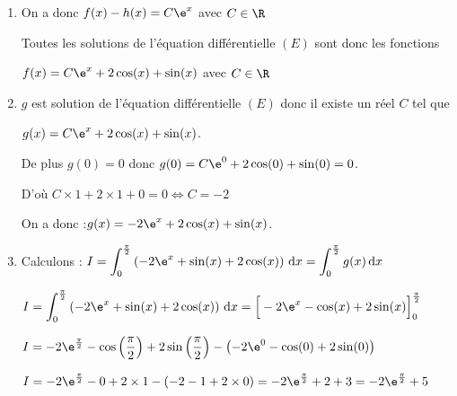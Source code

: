 \begin{enumerate}
\emph{Conclusion :} $f$ est solution de $(E)$ si et seulement si $f-h$ est solution de $(E_0)$.
		\item

On a donc $f(x)-h(x)= C\e^x$ avec $C \in \R$

Toutes les solutions de l'équation différentielle $(E)$ sont donc les fonctions

$f(x)=C\e^x +2\cos(x)+\sin(x)$ avec $C \in \R$

\item $g$ est solution de l'équation différentielle $(E)$  donc il existe un réel $C$ tel que

$g(x)=C\e^x +2\cos(x)+\sin(x)$.

De plus  $g(0)=0$ donc $g(0)=C\e^0 +2\cos(0)+\sin(0)=0$.

D'où $C\times 1 +2\times 1 + 0 =0 \Longleftrightarrow C=-2$

On a donc :\quad $g(x)=-2\e^x +2\cos(x)+\sin(x)$.

		\item
Calculons : \quad$\displaystyle
I = \int_{0}^{\frac{\pi}{2}}\left(-2 \e^{x}+\sin (x)+2 \cos (x)\right)\,  \mathrm{d} x = \int_{0}^{\frac{\pi}{2}} g(x)\,  \mathrm{d} x $


$\displaystyle
I = 	\int_{0}^{\frac{\pi}{2}}\left(-2 \e^{x}+\sin (x)+2 \cos (x)\right)\,  \mathrm{d} x = \Big[ -2\e^{x} -\cos(x) +2\sin(x) \Big]_0^ {\frac{\pi}{2}}$

$I= -2\e^{\frac{\pi}{2}} -\cos\left(  {\dfrac{\pi}{2}}\right) +2\sin\left(  {\dfrac{\pi}{2}}\right)  - \left(  -2\e^{0} -\cos(0) +2\sin(0)  \right) $

$I= -2\e^{\frac{\pi}{2}} -0+2\times 1 - \left( -2 -1+2\times 0\right) =  -2\e^{\frac{\pi}{2}}+ 2 +3  = -2\e^{\frac{\pi}{2}}+ 5  $

		\end{enumerate}

\medskip

